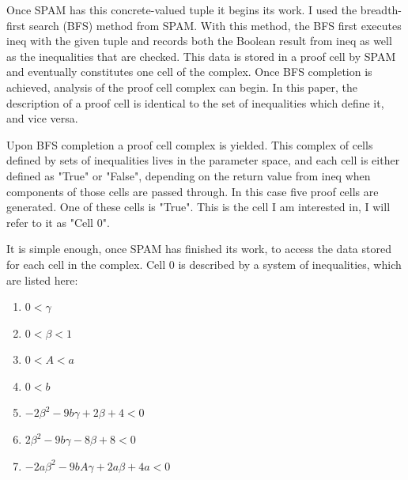 \documentclass{article}
\begin{document}
Once SPAM has this concrete-valued tuple it begins its work. I used the breadth-first search (BFS) method from SPAM. With this method, the BFS first executes ineq with the given tuple and records both the Boolean result from ineq as well as the inequalities that are checked. This data is stored in a proof cell by SPAM and eventually constitutes one cell of the complex. Once BFS completion is achieved, analysis of the proof cell complex can begin. In this paper, the description of a proof cell is identical to the set of inequalities which define it, and vice versa.

Upon BFS completion a proof cell complex is yielded. This complex of cells defined by sets of inequalities lives in the parameter space, and each cell is either defined as "True" or "False", depending on the return value from ineq when components of those cells are passed through. In this case five proof cells are generated. One of these cells is "True". This is the cell I am interested in, I will refer to it as "Cell 0".

It is simple enough, once SPAM has finished its work, to access the data stored for each cell in the complex. Cell 0 is described by a system of inequalities, which are listed here:
\begin{enumerate}
\item$0 < \gamma$
\item$0 < \beta < 1$
\item$0 < A < a$
\item$0 < b$
\item$-2\beta^{2} - 9b\gamma + 2\beta + 4 < 0$
\item$2\beta^{2} - 9b\gamma - 8\beta + 8 < 0$
\item$-2a\beta^{2} -9bA\gamma + 2a\beta +4a < 0$
\end{enumerate}
\end{document}
